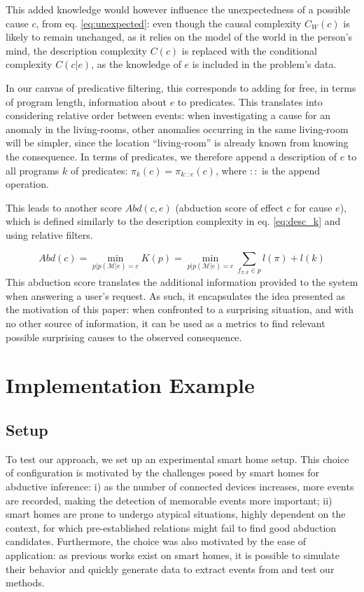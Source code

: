\documentclass[conference]{IEEEtran}
\begin{document}
This added knowledge would however influence the unexpectedness of a possible
cause $c$, from eq. \ref{eq:unexpected}: even though the causal complexity
$C_{W}(c)$ is likely to remain unchanged, as it relies on the model of the world in
the person's mind, the description complexity $C(c)$ is replaced with the
conditional complexity $C(c|e)$, as the knowledge of $e$ is included in the
problem's data.

In our canvas of predicative filtering, this corresponds to adding for free, in
terms of program length, information about $e$ to predicates. This translates
into considering relative order between events: when investigating a cause for
an anomaly in the living-rooms, other anomalies occurring in the same
living-room will be simpler, since the location ``living-room'' is already known
from knowing the consequence. In terms of predicates, we therefore append a
description of $e$ to all programs $k$ of predicates:
$\pi_{k}(c) = \pi_{k::e}(c)$, where $::$ is the append operation.

This leads to another score $Abd(c,e)$ (abduction score of effect $c$ for cause
$e$), which is defined similarly to the description complexity in eq.
\ref{eq:desc_k} and using relative filters.

\begin{equation}
  \label{eq:abd_k}
  Abd(c) = \min_{p | p(\mathcal{M}|e) = c} K(p) = \min_{p | p(\mathcal{M}|e)=c} \sum_{f_{\pi, k} \in p} l(\pi) + l(k)
\end{equation}
This abduction score translates the additional information provided to the
system when answering a user's request. As such, it encapsulates the idea
presented as the motivation of this paper: when confronted to a surprising
situation, and with no other source of information, it can be used as a metrics
to find relevant possible surprising causes to the observed consequence.

\section{Implementation Example}
\label{sec:example}
\subsection{Setup}
To test our approach, we set up an experimental smart home setup. This choice of
configuration is motivated by the challenges posed by smart homes for abductive
inference: i) as the number of connected devices increases, more events are
recorded, making the detection of memorable events more important; ii) smart
homes are prone to undergo atypical situations, highly dependent on the context,
for which pre-established relations might fail to find good abduction
candidates. Furthermore, the choice was also motivated by the ease of application: as
previous works exist on smart homes, it is possible to simulate their behavior
and quickly generate data to extract events from and test our methods.
\end{document}
